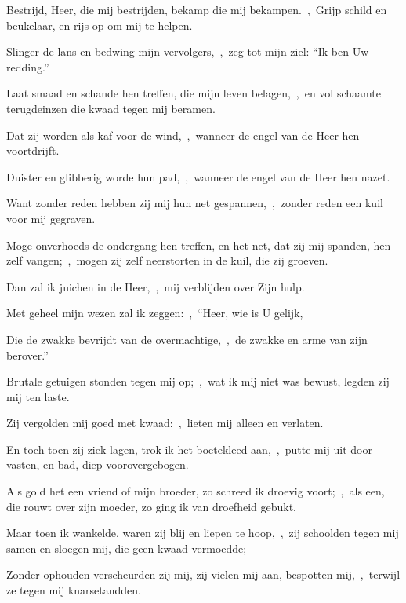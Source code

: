 \documentclass[12pt,twoside,a5paper]{article}
\begin{document}




\begin{halfparskip}
  Bestrijd, Heer, die mij bestrijden, bekamp die mij bekampen.~\sep\ Grijp schild en beukelaar, en rijs op om mij te helpen.


  Slinger de lans en bedwing mijn vervolgers,~\sep\ zeg tot mijn ziel: ``Ik ben Uw redding.''

  Laat smaad en schande hen treffen, die mijn leven belagen,~\sep\ en vol schaamte terugdeinzen die kwaad tegen mij beramen.

  Dat zij worden als kaf voor de wind,~\sep\ wanneer de engel van de Heer hen voortdrijft.

  Duister en glibberig worde hun pad,~\sep\ wanneer de engel van de Heer hen nazet.

  Want zonder reden hebben zij mij hun net gespannen,~\sep\ zonder reden een kuil voor mij gegraven.

  Moge onverhoeds de ondergang hen treffen, en het net, dat zij mij spanden, hen zelf vangen;~\sep\ mogen zij zelf neerstorten in de kuil, die zij groeven.

  Dan zal ik juichen in de Heer,~\sep\ mij verblijden over Zijn hulp.

  Met geheel mijn wezen zal ik zeggen:~\sep\ ``Heer, wie is U gelijk,

  Die de zwakke bevrijdt van de overmachtige,~\sep\ de zwakke en arme van zijn berover.''

  Brutale getuigen stonden tegen mij op;~\sep\ wat ik mij niet was bewust, legden zij mij ten laste.

  Zij vergolden mij goed met kwaad:~\sep\ lieten mij alleen en verlaten.
\end{halfparskip}


\begin{halfparskip}
  En toch toen zij ziek lagen, trok ik het boetekleed aan,~\sep\ putte mij uit door vasten, en bad, diep voorovergebogen.

  Als gold het een vriend of mijn broeder, zo schreed ik droevig voort;~\sep\ als een, die rouwt over zijn moeder, zo ging ik van droefheid gebukt.

  Maar toen ik wankelde, waren zij blij en liepen te hoop,~\sep\ zij schoolden tegen mij samen en sloegen mij, die geen kwaad vermoedde;

  Zonder ophouden verscheurden zij mij, zij vielen mij aan, bespotten mij,~\sep\ terwijl ze tegen mij knarsetandden.
\end{halfparskip}
\end{document}
